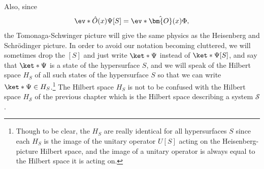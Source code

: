 \documentclass[12pt]{report}
\begin{document}
  Also, since 
\begin{equation}\label{schwingerformula}
\ev*{\hat{O}(x)}{\Psi[S]}=\ev*{\hat{\bm{O}}(x)}{\Phi},
\end{equation}
the Tomonaga-Schwinger picture will give the same physics as the Heisenberg and Schr\"{o}dinger picture. In order to avoid our notation becoming cluttered, we will sometimes drop the $[S]$ and just write $\ket*{\Psi}$ instead of $\ket*{\Psi[S]}$, and say that $\ket*{\Psi}$ is a state of the hypersurface $S$, and we will speak of the Hilbert space $H_S$\label{HSdef}  %
%
of all such states of the hypersurface $S$ so that we can write $\ket*{\Psi}\in H_S$.\footnote{Though to be clear,\label{HSclarification} the $H_S$ are really identical for all hypersurfaces $S$ since each $H_S$ is the image of the unitary operator $U[S]$ acting on the Heisenberg-picture Hilbert space, and the image of a unitary operator is always equal to the Hilbert space it is acting on.} The Hilbert space $H_S$ is not to be confused with the Hilbert space $H_\mathcal{S}$ of the previous chapter which is the Hilbert space describing a system $\mathcal{S}$. 
\end{document}
